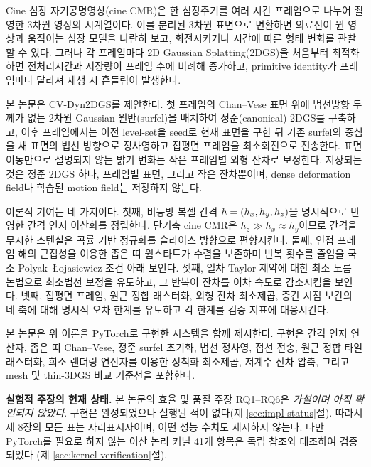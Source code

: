 Cine 심장 자기공명영상(cine CMR)은 한 심장주기를 여러 시간 프레임으로 나누어
촬영한 3차원 영상의 시계열이다. 이를 분리된 3차원 표면으로 변환하면 의료진이
원 영상과 움직이는 심장 모델을 나란히 보고, 회전시키거나 시간에 따른 형태 변화를
관찰할 수 있다. 그러나 각 프레임마다 2D Gaussian Splatting(2DGS)을 처음부터
최적화하면 전처리시간과 저장량이 프레임 수에 비례해 증가하고, primitive identity가
프레임마다 달라져 재생 시 흔들림이 발생한다.

본 논문은 CV-Dyn2DGS를 제안한다. 첫 프레임의 Chan--Vese 표면 위에 법선방향 두께가
없는 2차원 Gaussian 원반(surfel)을 배치하여 정준(canonical) 2DGS를 구축하고, 이후
프레임에서는 이전 level-set을 seed로 현재 표면을 구한 뒤 기존 surfel의 중심을
새 표면의 법선 방향으로 정사영하고 접평면 프레임을 최소회전으로 전송한다. 표면
이동만으로 설명되지 않는 밝기 변화는 작은 프레임별 외형 잔차로 보정한다. 저장되는
것은 정준 2DGS 하나, 프레임별 표면, 그리고 작은 잔차뿐이며, dense deformation
field나 학습된 motion field는 저장하지 않는다.

이론적 기여는 네 가지이다. 첫째, 비등방 복셀 간격 $h=(h_x,h_y,h_z)$을 명시적으로
반영한 간격 인지 이산화를 정립한다. 단기축 cine CMR은 $h_z \gg h_x \approx h_y$이므로
간격을 무시한 스텐실은 곡률 기반 정규화를 슬라이스 방향으로 편향시킨다. 둘째, 인접
프레임 해의 근접성을 이용한 좁은 띠 웜스타트가 수렴을 보존하며 반복 횟수를 줄임을
국소 Polyak--{\L}ojasiewicz 조건 아래 보인다. 셋째, 일차 Taylor 제약에 대한 최소
노름 논법으로 최소법선 보정을 유도하고, 그 반복이 잔차를 이차 속도로 감소시킴을
보인다. 넷째, 접평면 프레임, 원근 정합 래스터화, 외형 잔차 최소제곱, 중간 시점
보간의 네 축에 대해 명시적 오차 한계를 유도하고 각 한계를 검증 지표에 대응시킨다.

본 논문은 위 이론을 PyTorch로 구현한 시스템을 함께 제시한다. 구현은 간격 인지
연산자, 좁은 띠 Chan--Vese, 정준 surfel 초기화, 법선 정사영, 접선 전송, 원근 정합
타일 래스터화, 희소 렌더링 연산자를 이용한 정칙화 최소제곱, 저계수 잔차 압축,
그리고 mesh 및 thin-3DGS 비교 기준선을 포함한다.

\medskip
\noindent\textbf{실험적 주장의 현재 상태.}
본 논문의 효율 및 품질 주장 RQ1--RQ6은 \emph{가설이며 아직 확인되지 않았다}.
구현은 완성되었으나 실행된 적이 없다(제 \ref{sec:impl-status}절). 따라서 제 8장의
모든 표는 자리표시자이며, 어떤 성능 수치도 제시하지 않는다. 다만 PyTorch를
필요로 하지 않는 이산 논리 커널 41개 항목은 독립 참조와 대조하여 검증되었다
(제 \ref{sec:kernel-verification}절).
